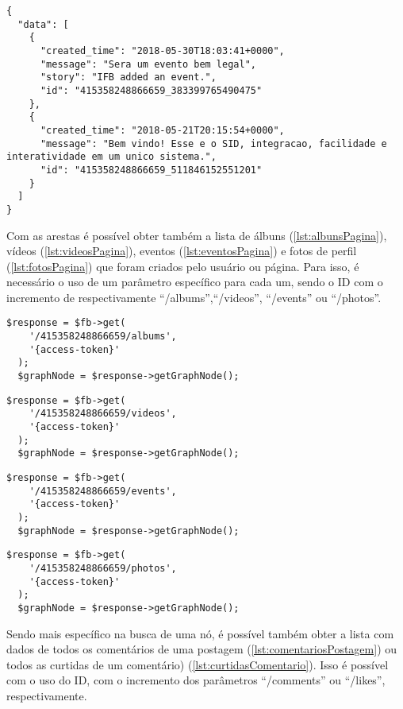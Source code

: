 \begin{lstlisting}[caption={Resposta da requisição \ref{lst:feedUsuario} (Feed)},label={lst:respostaFeed}]
{
  "data": [
    {
      "created_time": "2018-05-30T18:03:41+0000",
      "message": "Sera um evento bem legal",
      "story": "IFB added an event.",
      "id": "415358248866659_383399765490475"
    },
    {
      "created_time": "2018-05-21T20:15:54+0000",
      "message": "Bem vindo! Esse e o SID, integracao, facilidade e interatividade em um unico sistema.",
      "id": "415358248866659_511846152551201"
    }
  ]
}
\end{lstlisting}

Com as arestas é possível obter também a lista de álbuns (\ref{lst:albunsPagina}), vídeos (\ref{lst:videosPagina}), eventos (\ref{lst:eventosPagina}) e fotos de perfil (\ref{lst:fotosPagina}) que foram criados pelo usuário ou página. Para isso, é necessário o uso de um parâmetro específico para cada um, sendo o ID com o incremento de respectivamente ``/albums'',``/videos'', ``/events'' ou ``/photos''.
\begin{lstlisting}[caption={Requisitar todos os álbuns de uma página},label={lst:albunsPagina}]
  $response = $fb->get( 
    '/415358248866659/albums', 
    '{access-token}'
  );
  $graphNode = $response->getGraphNode();
\end{lstlisting}

\begin{lstlisting}[caption={Requisitar os vídeos publicados na página},label={lst:videosPagina}]
  $response = $fb->get( 
    '/415358248866659/videos', 
    '{access-token}'
  );
  $graphNode = $response->getGraphNode();
\end{lstlisting}

\begin{lstlisting}[caption={Requisitar os eventos agendados pela página},label={lst:eventosPagina}]
  $response = $fb->get( 
    '/415358248866659/events', 
    '{access-token}'
  );
  $graphNode = $response->getGraphNode();
\end{lstlisting}


\begin{lstlisting}[caption={Requisitar as fotos de perfil publicadas na página},label={lst:fotosPagina}]
  $response = $fb->get( 
    '/415358248866659/photos', 
    '{access-token}'
  );
  $graphNode = $response->getGraphNode();
\end{lstlisting}

Sendo mais específico na busca de uma nó, é possível também obter a lista com dados de todos os comentários de uma postagem (\ref{lst:comentariosPostagem}) ou todos as curtidas de um comentário) (\ref{lst:curtidasComentario}). Isso é possível com o uso do ID, com o incremento dos parâmetros ``/comments'' ou ``/likes'', respectivamente.

